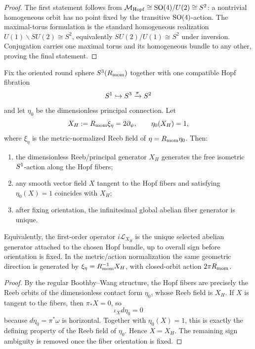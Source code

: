 \documentclass[11pt]{article}
\begin{document}
\begin{proof}
The first statement follows from
\(\mathcal M_{\mathrm{Hopf}}\cong\mathrm{SO}(4)/U(2)\cong S^2\): a nontrivial
homogeneous orbit has no point fixed by the transitive \(\mathrm{SO}(4)\)-action.
The maximal-torus formulation is the standard homogeneous realization
\(U(1)\backslash SU(2)\cong S^2\), equivalently
\(SU(2)/U(1)\cong S^2\) under inversion.  Conjugation carries one maximal torus and its
homogeneous bundle to any other, proving the final statement.
\end{proof}


\begin{theorem}
\label{p1:thm:canonical-hopf-u1}
Fix the oriented round sphere \(S^3(R_{\mathrm{mom}})\) together with one compatible Hopf fibration
\[
S^1 \hookrightarrow S^3 \xrightarrow{\pi} S^2
\]
and let \(\eta_0\) be the dimensionless principal connection. Let
\[
X_H:=R_{\mathrm{mom}}\xi_\eta=2\partial_\psi,
\qquad
\eta_0(X_H)=1,
\]
where \(\xi_\eta\) is the metric-normalized Reeb field of \(\eta=R_{\mathrm{mom}}\eta_0\).
Then:
\begin{enumerate}
    \item the dimensionless Reeb/principal generator \(X_H\) generates the free isometric \(S^1\)-action along the Hopf fibers;
    \item any smooth vector field \(X\) tangent to the Hopf fibers and satisfying \(\eta_0(X)=1\) coincides with \(X_H\);
    \item after fixing orientation, the infinitesimal global abelian fiber generator is unique.
\end{enumerate}
Equivalently, the first-order operator \(i\mathcal L_{X_H}\) is the unique selected abelian generator attached to the chosen Hopf bundle, up to overall sign before orientation is fixed. In the metric/action normalization the same geometric direction is generated by \(\xi_\eta=R_{\mathrm{mom}}^{-1}X_H\), with closed-orbit action \(2\pi R_{\mathrm{mom}}\).
\end{theorem}

\begin{proof}
By the regular Boothby--Wang structure, the Hopf fibers are precisely the Reeb orbits of the dimensionless contact form \(\eta_0\), whose Reeb field is \(X_H\). If \(X\) is tangent to the fibers, then \(\pi_*X=0\), so
\[
\iota_X d\eta_0 = 0
\]
because \(d\eta_0=\pi^*\omega\) is horizontal. Together with \(\eta_0(X)=1\), this is exactly the defining property of the Reeb field of \(\eta_0\). Hence \(X=X_H\). The remaining sign ambiguity is removed once the fiber orientation is fixed.
\end{proof}
\end{document}
